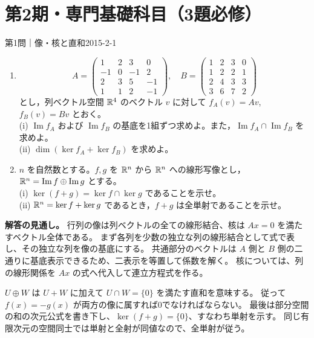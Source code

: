 \section{第2期・専門基礎科目（3題必修）}

\begin{problem}{第1問｜像・核と直和}{2015-2-1}
\begin{enumerate}
  \item[(1)] 
  \[
  A=\begin{pmatrix}1&2&3&0\\-1&0&-1&2\\2&3&5&-1\\1&1&2&-1\end{pmatrix},\quad
  B=\begin{pmatrix}1&2&3&0\\1&2&2&1\\2&4&3&3\\3&6&7&2\end{pmatrix}
  \]
  とし，列ベクトル空間 $\mathbb{R}^4$ のベクトル $v$ に対して $f_A(v)=Av$, $f_B(v)=Bv$ とおく。\\
  (i) $\operatorname{Im}f_A$ および $\operatorname{Im}f_B$ の基底を1組ずつ求めよ。また，$\operatorname{Im}f_A\cap\operatorname{Im}f_B$ を求めよ。\\
  (ii) $\dim(\ker f_A+\ker f_B)$ を求めよ。
  \item[(2)] $n$ を自然数とする。$f,g$ を $\mathbb{R}^n$ から $\mathbb{R}^n$ への線形写像とし，$\mathbb{R}^n=\operatorname{Im}f\oplus\operatorname{Im}g$ とする。\\
  (i) $\ker(f+g)=\ker f\cap\ker g$ であることを示せ。\\
  (ii) $\mathbb{R}^n=\ker f+\ker g$ であるとき，$f+g$ は全単射であることを示せ。
\end{enumerate}
\end{problem}
\begin{memo*}
\textbf{解答の見通し。}
行列の像は列ベクトルの全ての線形結合、核は $Ax=0$ を満たすベクトル全体である。
まず各列を少数の独立な列の線形結合として式で表し、その独立な列を像の基底にする。
共通部分のベクトルは $A$ 側と $B$ 側の二通りに基底表示できるため、二表示を等置して係数を解く。
核については、列の線形関係を $Ax$ の式へ代入して連立方程式を作る。

$U\oplus W$ は $U+W$ に加えて $U\cap W=\{0\}$ を満たす直和を意味する。
従って $f(x)=-g(x)$ が両方の像に属すれば0でなければならない。
最後は部分空間の和の次元公式を書き下し、$\ker(f+g)=\{0\}$、すなわち単射を示す。
同じ有限次元の空間同士では単射と全射が同値なので、全単射が従う。
\end{memo*}
